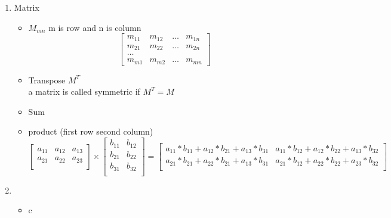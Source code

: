 \documentclass[11pt, a4paper]{article}
\begin{document}
\begin{enumerate}
        \item Matrix
            \begin{itemize}
                \item $M_{mn}$ m is row and n is column
                \[
                    \begin{bmatrix}
                        m_{11}  &  m_{12}  &  \dots  &  m_{1n}\\
                        m_{21}  &  m_{22}  &  \dots  &  m_{2n}\\
                        \dots\\
                        m_{m1}  &  m_{m2}  &  \dots  &  m_{mn}   
                    \end{bmatrix}
                \]
                \item Transpose $M^{T}$\\
                a matrix is called symmetric if $M^T = M$
                \item Sum
                \item product (first row second column)
                \[
                    \begin{bmatrix}
                        a_{11}  &  a_{12}   &  a_{13}\\
                        a_{21}  &  a_{22}   &  a_{23}\\
                    \end{bmatrix}
                    \times
                    \begin{bmatrix}
                        b_{11}  &  b_{12}\\
                        b_{21}  &  b_{22}\\
                        b_{31}  &  b_{32}\\
                    \end{bmatrix}            
                    =
                    \begin{bmatrix}
                        a_{11}*b_{11}+a_{12}*b_{21}+a_{13}*b_{31}  &  a_{11}*b_{12}+a_{12}*b_{22}+a_{13}*b_{32}\\
                        a_{21}*b_{21}+a_{22}*b_{21}+a_{13}*b_{31}  &  a_{21}*b_{12}+a_{22}*b_{22}+a_{23}*b_{32}\\
                    \end{bmatrix}                       
                \]
            \end{itemize}
        \item
            \begin{itemize}
                \item c
            \end{itemize}
        \end{enumerate}
\end{document}
